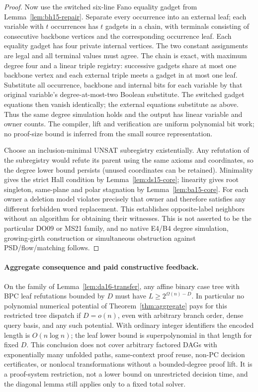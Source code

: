 \documentclass[11pt]{article}
\begin{document}
\begin{proof}
Now use the switched six-line Fano equality gadget from Lemma~\ref{lem:bh15-repair}. Separate every occurrence into an external leaf; each variable with $t$ occurrences has $t$ gadgets in a chain, with terminals consisting of consecutive backbone vertices and the corresponding occurrence leaf. Each equality gadget has four private internal vertices. The two constant assignments are legal and all terminal values must agree. The chain is exact, with maximum degree four and a linear triple registry: successive gadgets share at most one backbone vertex and each external triple meets a gadget in at most one leaf. Substitute all occurrence, backbone and internal bits for each variable by that original variable's degree-at-most-two Boolean substitute. The switched gadget equations then vanish identically; the external equations substitute as above. Thus the same degree simulation holds and the output has linear variable and owner counts. The compiler, lift and verification are uniform polynomial bit work; no proof-size bound is inferred from the small source representation.

Choose an inclusion-minimal UNSAT subregistry existentially. Any refutation of the subregistry would refute its parent using the same axioms and coordinates, so the degree lower bound persists (unused coordinates can be retained). Minimality gives the strict Hall condition by Lemma~\ref{lem:ds15-core}; linearity gives root singleton, same-plane and polar stagnation by Lemma~\ref{lem:ba15-core}. For each owner a deletion model violates precisely that owner and therefore satisfies any different forbidden word replacement. This establishes opposite-label neighbors without an algorithm for obtaining their witnesses. This is not asserted to be the particular DO09 or MS21 family, and no native E4/B4 degree simulation, growing-girth construction or simultaneous obstruction against PSD/flow/matching follows.
\end{proof}

\paragraph{Aggregate consequence and paid constructive feedback.}
On the family of Lemma~\ref{lem:da16-transfer}, any affine binary case tree with BPC leaf refutations bounded by $D$ must have $L\ge 2^{\Omega(n)-D}$. In particular no polynomial numerical potential of Theorem~\ref{thm:aggregate} pays for this restricted tree dispatch if $D=o(n)$, even with arbitrary branch order, dense query basis, and any such potential. With ordinary integer identifiers the encoded length is $O(n\log n)$; the leaf lower bound is superpolynomial in that length for fixed $D$. This conclusion does not cover arbitrary factored DAGs with exponentially many unfolded paths, same-context proof reuse, non-PC decision certificates, or nonlocal transformations without a bounded-degree proof lift. It is a proof-system restriction, not a lower bound on unrestricted decision time, and the diagonal lemma still applies only to a fixed total solver.
\end{document}
